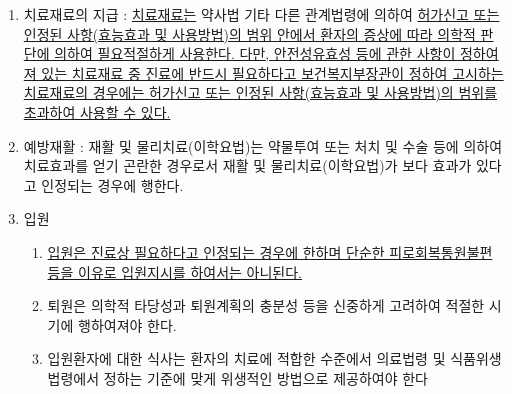 \begin{enumerate}[1.]
\begin{enumerate}[가.]
\begin{enumerate}[(1)]
		\item 혼합주사는 치료효과를 높일 수 있다고 의학적으로 인정되는 경우에 한한다. 
		\item \uline{당류제제\cntrdot{}전해질제제\cntrdot{}복합아미노산제제\cntrdot{}혈액대용제\cntrdot{}혈액 및 혈액성분제제의 주사는 의학적으로 특히 필요하다고 인정되는 경우에 한한다.}
		\end{enumerate}
	\end{enumerate}
\item 치료재료의 지급 : 
\uline{치료재료는} 약사법 기타 다른 관계법령에 의하여 \uline{허가\cntrdot{}신고 또는 인정된 사항(효능\cntrdot{}효과 및 사용방법)의 범위 안에서 환자의 증상에 따라 의학적 판단에 의하여 필요\cntrdot{}적절하게 사용한다. 다만, 안전성\cntrdot{}유효성 등에 관한 사항이 정하여져 있는 치료재료 중 진료에 반드시 필요하다고 보건복지부장관이 정하여 고시하는 치료재료의 경우에는 허가\cntrdot{}신고 또는 인정된 사항(효능\cntrdot{}효과 및 사용방법)의 범위를 초과하여 사용할 수 있다.}
\item 예방\cntrdot{}재활 : 
재활 및 물리치료(이학요법)는 약물투여 또는 처치 및 수술 등에 의하여 치료효과를 얻기 곤란한 경우로서 재활 및 물리치료(이학요법)가 보다 효과가 있다고 인정되는 경우에 행한다.
\item 입원
	\begin{enumerate}[가.]\tightlist
	\item \uline{입원은 진료상 필요하다고 인정되는 경우에 한하며 단순한 피로회복\cntrdot{}통원불편 등을 이유로 입원지시를 하여서는 아니된다.}
	\item 퇴원은 의학적 타당성과 퇴원계획의 충분성 등을 신중하게 고려하여 적절한 시기에 행하여져야 한다.
	\item 입원환자에 대한 식사는 환자의 치료에 적합한 수준에서 의료법령 및 식품위생법령에서 정하는 기준에 맞게 위생적인 방법으로 제공하여야 한다
	\end{enumerate}
\end{enumerate}